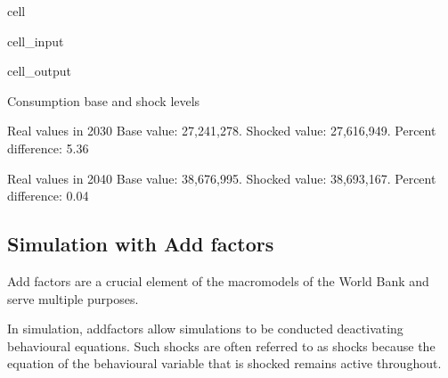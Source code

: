 \documentclass[letterpaper,10pt,english]{jupyterBook}
\begin{document}
\begin{sphinxuseclass}{cell}
\begin{sphinxVerbatimInput}
\begin{sphinxuseclass}{cell_input}
\begin{sphinxVerbatim}[commandchars=\\\{\}]
    \PYG{p}{[}\PYG{p}{]}\PYG{p}{[}\PYG{p}{]}\PYG{p}{[}\PYG{p}{]}
\end{sphinxVerbatim}

\end{sphinxuseclass}\end{sphinxVerbatimInput}
\begin{sphinxVerbatimOutput}

\begin{sphinxuseclass}{cell_output}
\begin{sphinxVerbatim}[commandchars=\\\{\}]
Consumption base and shock levels

Real values in 2030
Base value:  27,241,278.	Shocked value: 27,616,949.
Percent difference: 5.36

Real values in 2040
Base value:  38,676,995.	Shocked value: 38,693,167.
Percent difference: 0.04
\end{sphinxVerbatim}

\end{sphinxuseclass}\end{sphinxVerbatimOutput}

\end{sphinxuseclass}

\subsection{Simulation with Add factors}
\label{\detokenize{content/05_WBModels/ScenarioAnalysis:simulation-with-add-factors}}
\sphinxAtStartPar
Add factors are a crucial element of the macromodels of the World Bank and serve multiple purposes.

\sphinxAtStartPar
In simulation, add\sphinxhyphen{}factors allow simulations to be conducted  de\sphinxhyphen{}activating behavioural equations.  Such shocks are often referred to as  shocks because the equation of the behavioural variable that is shocked remains  active throughout.
\end{document}
